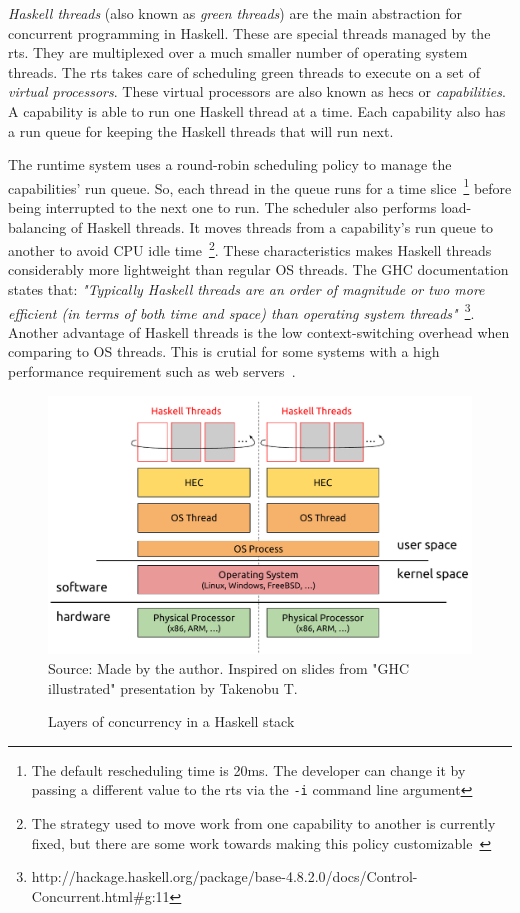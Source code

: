 \emph{Haskell threads} (also known as \emph{green threads}) are the main abstraction for concurrent programming in Haskell. These are special threads managed by the \acl{rts}. They are multiplexed over a much smaller number of operating system threads. The \ac{rts} takes care of scheduling green threads to execute on a set of \emph{virtual processors}. These virtual processors are also known as \acp{hec} or \emph{capabilities}. A capability is able to run one Haskell thread at a time. Each capability also has a run queue for keeping the Haskell threads that will run next.

The runtime system uses a round-robin scheduling policy to manage the capabilities' run queue. So, each thread in the queue runs for a time slice~\footnote{The default rescheduling time is 20ms. The developer can change it by passing a different value to the \ac{rts} via the \texttt{-i} command line argument} before being interrupted to the next one to run. The scheduler also performs load-balancing of Haskell threads. It moves threads from a capability's run queue to another to avoid CPU idle time~\footnote{The strategy used to move work from one capability to another is currently fixed, but there are some work towards making this policy customizable~\citep{siva:2014}}. These characteristics makes Haskell threads considerably more lightweight than regular OS threads. The GHC documentation states that: \emph{"Typically Haskell threads are an order of magnitude or two more efficient (in terms of both time and space) than operating system threads"}~\footnote{http://hackage.haskell.org/package/base-4.8.2.0/docs/Control-Concurrent.html\#g:11}. Another advantage of Haskell threads is the low context-switching overhead when comparing to OS threads. This is crutial for some systems with a high performance requirement such as web servers~\citep{voellmy:2013}.

\begin{figure}[htp]
  \centering
  \caption{Layers of concurrency in a Haskell stack}
  \includegraphics[width=\columnwidth]{images/haskell-concurrency-layers}
  \footnotesize{Source: Made by the author. Inspired on slides from "GHC illustrated" presentation by Takenobu T.}
  \label{fig:haskell-conc-layers}
\end{figure}

